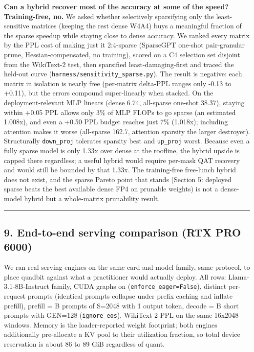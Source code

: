 \documentclass[
]{article}
\begin{document}
\textbf{Can a hybrid recover most of the accuracy at some of the speed?
Training-free, no.} We asked whether selectively sparsifying only the
least-sensitive matrices (keeping the rest dense W4A4) buys a meaningful
fraction of the sparse speedup while staying close to dense accuracy. We
ranked every matrix by the PPL cost of making just it 2:4-sparse
(SparseGPT one-shot pair-granular prune, Hessian-compensated, no
training), scored on a C4 selection set disjoint from the WikiText-2
test, then sparsified least-damaging-first and traced the held-out curve
(\texttt{harness/sensitivity\_sparse.py}). The result is negative: each
matrix in isolation is nearly free (per-matrix delta-PPL ranges only
-0.13 to +0.11), but the errors compound super-linearly when stacked. On
the deployment-relevant MLP linears (dense 6.74, all-sparse one-shot
38.37), staying within +0.05 PPL allows only 3\% of MLP FLOPs to go
sparse (an estimated 1.008x), and even a +0.50 PPL budget reaches just
7\% (1.018x); including attention makes it worse (all-sparse 162.7,
attention sparsity the larger destroyer). Structurally
\texttt{down\_proj} tolerates sparsity best and \texttt{up\_proj} worst.
Because even a fully sparse model is only 1.33x over dense at the
roofline, the hybrid upside is capped there regardless; a useful hybrid
would require per-mask QAT recovery and would still be bounded by that
1.33x. The training-free free-lunch hybrid does not exist, and the
sparse Pareto point that stands (Section 5: deployed sparse beats the
best available dense FP4 on prunable weights) is not a dense-model
hybrid but a whole-matrix prunability result.

\begin{center}\rule{0.5\linewidth}{0.5pt}\end{center}

\subsection{9. End-to-end serving comparison (RTX PRO
6000)}\label{end-to-end-serving-comparison-rtx-pro-6000}

We ran real serving engines on the same card and model family, same
protocol, to place quadbit against what a practitioner would actually
deploy. All rows: Llama-3.1-8B-Instruct family, CUDA graphs on
(\texttt{enforce\_eager=False}), distinct per-request prompts (identical
prompts collapse under prefix caching and inflate prefill), prefill = B
prompts of S=2048 with 1 output token, decode = B short prompts with
GEN=128 (\texttt{ignore\_eos}), WikiText-2 PPL on the same 16x2048
windows. Memory is the loader-reported weight footprint; both engines
additionally pre-allocate a KV pool to their utilization fraction, so
total device reservation is about 86 to 89 GiB regardless of quant.
\end{document}
